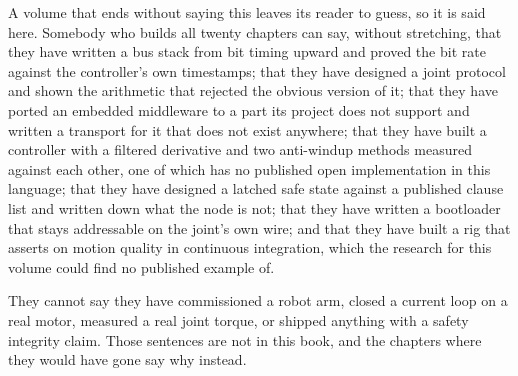 A volume that ends without saying this leaves its reader to guess, so it is said
here. Somebody who builds all twenty chapters can say, without stretching, that
they have written a bus stack from bit timing upward and proved the bit rate
against the controller's own timestamps; that they have designed a joint
protocol and shown the arithmetic that rejected the obvious version of it; that
they have ported an embedded middleware to a part its project does not support
and written a transport for it that does not exist anywhere; that they have
built a controller with a filtered derivative and two anti-windup methods
measured against each other, one of which has no published open implementation
in this language; that they have designed a latched safe state against a
published clause list and written down what the node is not; that they have
written a bootloader that stays addressable on the joint's own wire; and that
they have built a rig that asserts on motion quality in continuous integration,
which the research for this volume could find no published example of.

They cannot say they have commissioned a robot arm, closed a current loop on a
real motor, measured a real joint torque, or shipped anything with a safety
integrity claim. Those sentences are not in this book, and the chapters where
they would have gone say why instead.
